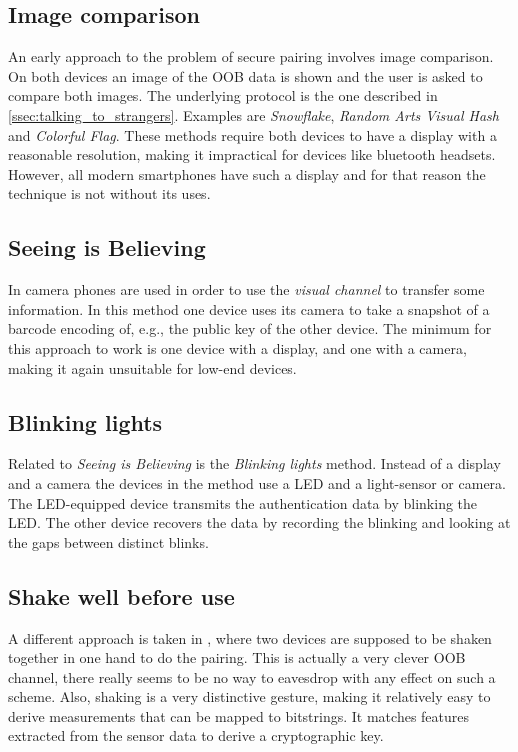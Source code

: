 \documentclass[conference, 11pt]{sty/IEEEtran}
\begin{document}
\subsection{Image comparison}
An early approach to the problem of secure pairing involves image comparison.
On both devices an image of the OOB data is shown and the user is asked to compare both images.
The underlying protocol is the one described in \autoref{ssec:talking_to_strangers}.
Examples are \textit{Snowflake}\cite{goldberg1996visual}, \textit{Random Arts Visual Hash}\cite{perrig1999hash} and \textit{Colorful Flag}\cite{dohrmann2002public}.
These methods require both devices to have a display with a reasonable resolution, making it impractical for devices like bluetooth headsets.
However, all modern smartphones have such a display and for that reason the technique is not without its uses.

\subsection{Seeing is Believing}
In \cite{mccune2005seeing} camera phones are used in order to use the \textit{visual channel} to transfer some information.
In this method one device uses its camera to take a snapshot of a barcode encoding of, e.g., the public key of the other device.
The minimum for this approach to work is one device with a display, and one with a camera, making it again unsuitable for low-end devices.

\subsection{Blinking lights}
Related to \textit{Seeing is Believing} is the \textit{Blinking lights} method.
Instead of a display and a camera the devices in the method use a LED and a light-sensor or camera.
The LED-equipped device transmits the authentication data by blinking the LED.
The other device recovers the data by recording the blinking and looking at the gaps between distinct blinks.

\subsection{Shake well before use}
A different approach is taken in \cite{mayrhofer2009shake}, where two devices are supposed to be shaken together in one hand to do the pairing.
This is actually a very clever OOB channel, there really seems to be no way to eavesdrop with any effect on such a scheme.
Also, shaking is a very distinctive gesture, making it relatively easy to derive measurements that can be mapped to bitstrings.
It matches features extracted from the sensor data to derive a cryptographic key.
\end{document}
